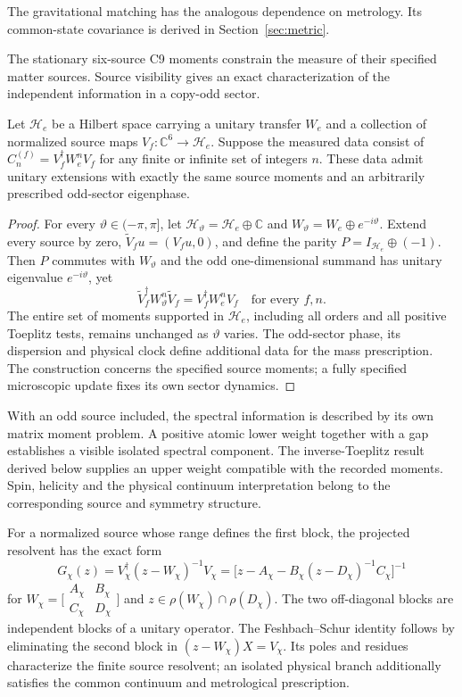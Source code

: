 The gravitational matching has the analogous dependence on metrology. Its common-state covariance is derived in Section~\ref{sec:metric}.

\label{sec:odd-no-go}
The stationary six-source C9 moments constrain the measure of their specified matter sources. Source visibility gives an exact characterization of the independent information in a copy-odd sector.
\begin{proposition}\label{prop:odd-nonidentification}
Let $\mathcal H_e$ be a Hilbert space carrying a unitary transfer $W_e$ and a collection of normalized source maps $V_f:\mathbb C^6\to\mathcal H_e$. Suppose the measured data consist of $C_n^{(f)}=V_f^\dagger W_e^nV_f$ for any finite or infinite set of integers $n$. These data admit unitary extensions with exactly the same source moments and an arbitrarily prescribed odd-sector eigenphase.
\end{proposition}
\begin{proof}
For every $\vartheta\in(-\pi,\pi]$, let $\mathcal H_\vartheta=\mathcal H_e\oplus\mathbb C$ and $W_\vartheta=W_e\oplus e^{-i\vartheta}$. Extend every source by zero, $\widetilde V_f u=(V_fu,0)$, and define the parity $P=I_{\mathcal H_e}\oplus(-1)$. Then $P$ commutes with $W_\vartheta$ and the odd one-dimensional summand has unitary eigenvalue $e^{-i\vartheta}$, yet
\[
\widetilde V_f^\dagger W_\vartheta^n\widetilde V_f=V_f^\dagger W_e^nV_f
\quad\text{for every }f,n.
\]
The entire set of moments supported in $\mathcal H_e$, including all orders and all positive Toeplitz tests, remains unchanged as $\vartheta$ varies. The odd-sector phase, its dispersion and physical clock define additional data for the mass prescription. The construction concerns the specified source moments; a fully specified microscopic update fixes its own sector dynamics.
\end{proof}
With an odd source included, the spectral information is described by its own matrix moment problem. A positive atomic lower weight together with a gap establishes a visible isolated spectral component. The inverse-Toeplitz result derived below supplies an upper weight compatible with the recorded moments. Spin, helicity and the physical continuum interpretation belong to the corresponding source and symmetry structure.

For a normalized source whose range defines the first block, the projected resolvent has the exact form
\begin{equation}
G_\chi(z)=V_\chi^\dagger(z-W_\chi)^{-1}V_\chi
=\big[z-A_\chi-B_\chi(z-D_\chi)^{-1}C_\chi\big]^{-1}
\label{eq:odd-feshbach}
\end{equation}
for $W_\chi=\bigl[\begin{smallmatrix}A_\chi&B_\chi\\ C_\chi&D_\chi\end{smallmatrix}\bigr]$ and $z\in\rho(W_\chi)\cap\rho(D_\chi)$. The two off-diagonal blocks are independent blocks of a unitary operator. The Feshbach--Schur identity follows by eliminating the second block in $(z-W_\chi)X=V_\chi$. Its poles and residues characterize the finite source resolvent; an isolated physical branch additionally satisfies the common continuum and metrological prescription.

